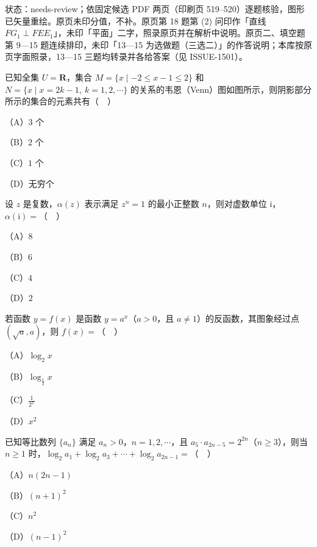 

状态：needs-review；依固定候选 PDF 两页（印刷页 519–520）逐题核验，图形已矢量重绘。原页未印分值，不补。原页第 18 题第 (2) 问印作「直线 $FG_1\perp FEE_1$」，未印「平面」二字，照录原页并在解析中说明。原页二、填空题第 9—15 题连续排印，未印「13—15 为选做题（三选二）」的作答说明；本库按原页字面照录，13—15 三题均转录并各给答案（见 ISSUE-1501）。


\Needspace{0.4\textheight}
\begingroup
\renewenvironment{question}{\Needspace{0.4\textheight}}{}
\begin{question}
已知全集 $U=\mathbf R$，集合 $M=\{x\mid -2\leqslant x-1\leqslant 2\}$ 和 $N=\{x\mid x=2k-1,\ k=1,2,\cdots\}$ 的关系的韦恩（Venn）图如图所示，则阴影部分所示的集合的元素共有（　）

（A）$3$ 个

（B）$2$ 个

（C）$1$ 个

（D）无穷个
\nopagebreak[4]
\begin{center}\end{center}
\nopagebreak[4]
\end{question}
\endgroup
\begin{question}
设 $z$ 是复数，$\alpha(z)$ 表示满足 $z^n=1$ 的最小正整数 $n$，则对虚数单位 $\mathrm i$，$\alpha(\mathrm i)=$（　）

（A）$8$

（B）$6$

（C）$4$

（D）$2$

\end{question}
\begin{question}
若函数 $y=f(x)$ 是函数 $y=a^x$（$a>0$，且 $a\neq1$）的反函数，其图象经过点 $(\sqrt a,a)$，则 $f(x)=$（　）

（A）$\log_2 x$

（B）$\log_{\frac12}x$

（C）$\frac{1}{2^x}$

（D）$x^2$

\end{question}
\begin{question}
已知等比数列 $\{a_n\}$ 满足 $a_n>0$，$n=1,2,\cdots$，且 $a_5\cdot a_{2n-5}=2^{2n}$（$n\geqslant3$），则当 $n\geqslant1$ 时，$\log_2 a_1+\log_2 a_3+\cdots+\log_2 a_{2n-1}=$（　）

（A）$n(2n-1)$

（B）$(n+1)^2$

（C）$n^2$

（D）$(n-1)^2$

\end{question}
